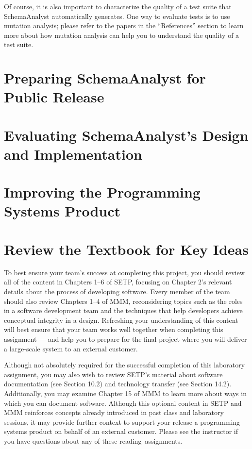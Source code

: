 Of course, it is also important to characterize the quality of a test suite that SchemaAnalyst automatically generates.
One way to evaluate tests is to use mutation analysis; please refer to the papers in the ``References'' section to learn
more about how mutation analysis can help you to understand the quality of a test suite.

\section*{Preparing SchemaAnalyst for Public Release}

\section*{Evaluating SchemaAnalyst's Design and Implementation}

\section*{Improving the Programming Systems Product}

\section*{Review the Textbook for Key Ideas}

To best ensure your team's success at completing this project, you should review all of the content in Chapters 1--6 of
SETP, focusing on Chapter 2's relevant details about the process of developing software. Every member of the team should
also review Chapters 1--4 of MMM, reconsidering topics such as the roles in a software development team and the
techniques that help developers achieve conceptual integrity in a design. Refreshing your understanding of this content
will best ensure that your team works well together when completing this assignment --- and help you to prepare for the
final project where you will deliver a large-scale system to an external customer.

Although not absolutely required for the successful completion of this laboratory assignment, you may also wish to
review SETP's material about software documentation (see Section 10.2) and technology transfer (see Section 14.2).
Additionally, you may examine Chapter 15 of MMM to learn more about ways in which you can document software. Although
this optional content in SETP and MMM reinforces concepts already introduced in past class and laboratory sessions, it
may provide further context to support your release a programming systems product on behalf of an external customer.
Please see the instructor if you have questions about any of these \mbox{reading assignments}.

